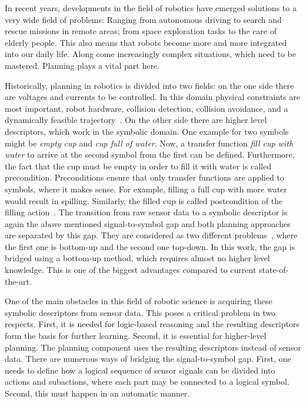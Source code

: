 In recent years, developments in the field of robotics have emerged solutions to a very wide field of problems: Ranging from autonomous driving to search and rescue missions in remote areas; from space exploration tasks to the care of elderly people.
This also means that robots become more and more integrated into our daily life.
Along come increasingly complex situations, which need to be mastered.
Planning plays a vital part here.

Historically, planning in robotics is divided into two fields: on the one side there are voltages and currents to be controlled.
In this domain physical constraints are most important, \ie robot hardware, collision detection, collision avoidance, and a dynamically feasible trajectory~\cite{choset2005, plaku2010}.
On the other side there are higher level descriptors, which work in the symbolic domain.
One example for two symbols might be \emph{empty cup} and \emph{cup full of water}.
Now, a transfer function \emph{fill cup with water} to arrive at the second symbol from the first can be defined.
Furthermore, the fact that the cup must be empty in order to fill it with water is called precondition.
Preconditions ensure that only transfer functions are applied to symbols, where it makes sense.
For example, filling a full cup with more water would result in spilling.
Similarly, the filled cup is called postcondition of the filling action~\cite[p. 66f., p. 335f.]{golding2006interactive}.
The transition from raw sensor data to a symbolic descriptor is again the above mentioned signal-to-symbol gap and both planning approaches are separated by this gap.
They are considered as two different problems~\cite{arkin1990, payton1990, belta2007}, where the first one is bottom-up and the second one top-down.
In this work, the gap is bridged using a bottom-up method, which requires almost no higher level knowledge.
This is one of the biggest advantages compared to current state-of-the-art.

One of the main obstacles in this field of robotic science is acquiring these symbolic descriptors from sensor data.
This poses a critical problem in two respects.
First, it is needed for logic-based reasoning and the resulting descriptors form the basis for further learning.
Second, it is essential for higher-level planning.
The planning component uses the resulting descriptors instead of sensor data.
There are numerous ways of bridging the signal-to-symbol gap.
First, one needs to define how a logical sequence of sensor signals can be divided into actions and subactions, where each part may be connected to a logical symbol.
Second, this must happen in an automatic manner.

